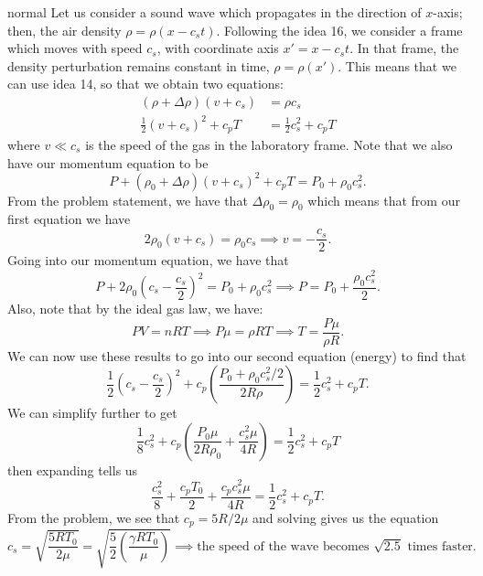 \begin{solution}{normal}
Let us consider a sound wave which propagates in the direction of $x$-axis; then, the air density $\rho = \rho (x - c_s t)$. Following the idea 16, we consider a frame which moves with speed $c_s$, with coordinate axis $x' = x - c_s t$. In that frame, the density perturbation remains constant in time, $\rho = \rho (x')$. This means that we can use idea 14, so that we obtain two equations:
\begin{align*}
(\rho + \Delta \rho) (v + c_s) &= \rho c_s\\
\frac{1}{2} (v + c_s)^2 + c_p T &= \frac{1}{2}c_s^2 + c_p T
\end{align*}
where $v\ll c_s$ is the speed of the gas in the laboratory frame. Note that we also have our momentum equation to be 
\[P + (\rho_0 + \Delta \rho)(v + c_s)^2 + c_p T = P_0 + \rho_0 c_s^2.\]
From the problem statement, we have that $\Delta \rho_0 = \rho_0$ which means that from our first equation we have 
\[2\rho_0 (v + c_s) = \rho_0 c_s\implies v = -\frac{c_s}{2}.\]
Going into our momentum equation, we have that 
\[P + 2\rho_0 \left(c_s - \frac{c_s}{2}\right)^2 = P_0 + \rho_0 c_s^2\implies P = P_0 + \frac{\rho_0 c_s^2}{2}.\]
Also, note that by the ideal gas law, we have:
$$PV=nRT \implies P\mu=\rho RT\implies T = \frac{P\mu}{\rho R}.$$
We can now use these results to go into our second equation (energy) to find that 
\[\frac{1}{2}\left(c_s - \frac{c_s}{2}\right)^2 + c_p \left(\frac{P_0 + \rho_0 c_s^2/2}{2R\rho}\right) = \frac{1}{2}c_s^2 + c_p T.\]
We can simplify further to get 
\[\frac{1}{8}c_s^2 + c_p \left(\frac{P_0\mu}{2R\rho_0} + \frac{c_s^2 \mu}{4R}\right) = \frac{1}{2}c_s^2 + c_p T\]
then expanding tells us 
\[\frac{c_s^2}{8} + \frac{c_p T_0}{2} + \frac{c_p c_s^2\mu}{4R} = \frac{1}{2}c_s^2 + c_p T.\]
From the problem, we see that $c_p = 5R/2\mu$ and solving gives us the equation 
\[c_s = \sqrt{\frac{5RT_0}{2\mu}} = \sqrt{\frac{5}{2}\left(\frac{\gamma RT_0}{\mu}\right)} \implies \text{the speed of the wave becomes } \sqrt{2.5} \text{ times faster.}\]
\end{solution}